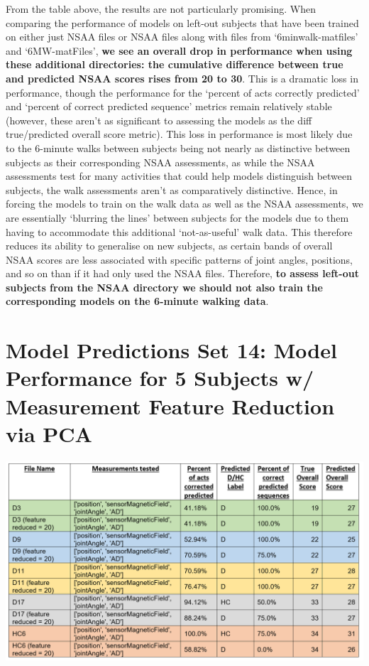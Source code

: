 \documentclass[12pt,twoside]{report}
\begin{document}
\quad From the table above, the results are not particularly promising. When comparing the performance of models on left-out subjects that have been trained on either just NSAA files or NSAA files along with files from ‘6minwalk-matfiles’ and ‘6MW-matFiles’, \textbf{we see an overall drop in performance when using these additional directories: the cumulative difference between true and predicted NSAA scores rises from 20 to 30}. This is a dramatic loss in performance, though the performance for the ‘percent of acts correctly predicted’ and ‘percent of correct predicted sequence’ metrics remain relatively stable (however, these aren’t as significant to assessing the models as the diff true/predicted overall score metric). This loss in performance is most likely due to the 6-minute walks between subjects being not nearly as distinctive between subjects as their corresponding NSAA assessments, as while the NSAA assessments test for many activities that could help models distinguish between subjects, the walk assessments aren’t as comparatively distinctive. Hence, in forcing the models to train on the walk data as well as the NSAA assessments, we are essentially ‘blurring the lines’ between subjects for the models due to them having to accommodate this additional ‘not-as-useful’ walk data. This therefore reduces its ability to generalise on new subjects, as certain bands of overall NSAA scores are less associated with specific patterns of joint angles, positions, and so on than if it had only used the NSAA files. Therefore, \textbf{to assess left-out subjects from the NSAA directory we should not also train the corresponding models on the 6-minute walking data}.




\section{Model Predictions Set 14: Model Performance for 5 Subjects w/ Measurement Feature Reduction via PCA}

\begin{center}
\includegraphics[scale=0.4]{project_figures/fig11_21}
\end{center}
\end{document}
